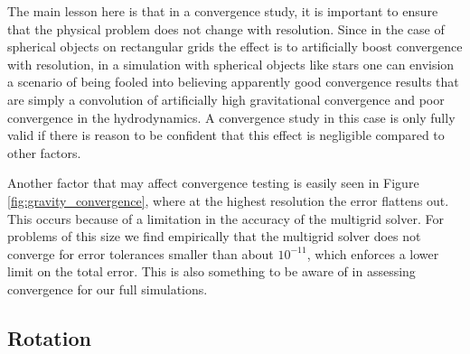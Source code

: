 \documentclass{emulateapj}
\begin{document}
The main lesson here is that in a convergence study, it is important
to ensure that the physical problem does not change with
resolution. Since in the case of spherical objects on rectangular
grids the effect is to artificially boost convergence with resolution,
in a simulation with spherical objects like stars one can envision a
scenario of being fooled into believing apparently good convergence
results that are simply a convolution of artificially high
gravitational convergence and poor convergence in the hydrodynamics. A
convergence study in this case is only fully valid if there is reason
to be confident that this effect is negligible compared to other
factors.

Another factor that may affect convergence testing is easily seen in
Figure \ref{fig:gravity_convergence}, where at the highest resolution
the error flattens out. This occurs because of a limitation in the
accuracy of the multigrid solver. For problems of this size we find
empirically that the multigrid solver does not converge for error
tolerances smaller than about $10^{-11}$, which enforces a lower limit
on the total error. This is also something to be aware of in assessing
convergence for our full simulations.

\subsection{Rotation}\label{sec:rotation}
\end{document}
